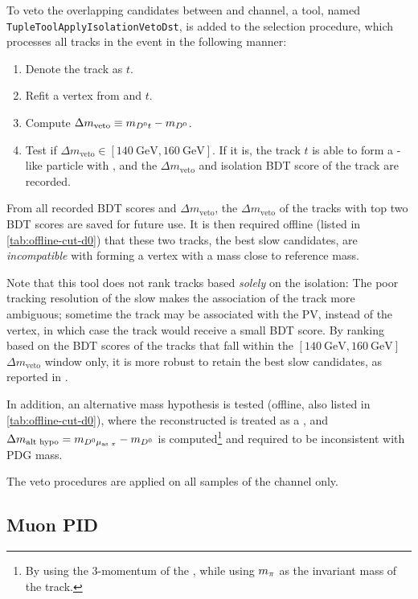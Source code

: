 To veto the overlapping candidates between \Dz and \Dstar channel,
a tool, named \texttt{TupleToolApplyIsolationVetoDst},
is added to the selection procedure, which processes all tracks
in the event in the following manner:

\begin{enumerate}
    \item Denote the track as $t$.
    \item Refit a vertex from \Dz and $t$.
    \item Compute $\Delta m_\text{veto} \equiv m_{{{D}^0} t} - m_{{D}^0}$.
    \item Test if $\Delta m_\text{veto} \in [140~\text{GeV}, 160~\text{GeV}]$.
        If it is, the track $t$ is able to form a \Dstar-like particle with \Dz,
        and the $\Delta m_\text{veto}$ and isolation BDT score
        of the track are recorded.
\end{enumerate}

From all recorded BDT scores and $\Delta m_\text{veto}$, the
$\Delta m_\text{veto}$ of the tracks with top two BDT scores are saved
for future use.
It is then required offline (listed in \cref{tab:offline-cut-d0})
that these two tracks,
the best slow \pion candidates,
are \emph{incompatible} with
forming a \Dz\pion vertex with a mass close to \Dstar reference mass.

Note that this tool does not rank tracks based \emph{solely} on the isolation:
The poor tracking resolution of the slow \pion makes the association of
the track more ambiguous; sometime the track may be associated with the PV,
instead of the \B vertex, in which case the track would receive a small BDT
score.
By ranking based on the BDT scores of the tracks that fall within the
$[140~\text{GeV}, 160~\text{GeV}]$
$\Delta m_\text{veto}$ window only,
it is more robust to retain the best slow \pion candidates,
as reported in \cite{LHCb-ANA-2020-056}.

In addition, an alternative mass hypothesis is tested
(offline, also listed in \cref{tab:offline-cut-d0}), where the reconstructed
\muon is treated as a \pion,
and $\Delta m_\text{alt hypo} = m_{{{D}^0}{\mu}_\text{as {\ensuremath{\pi}}}} - m_{{D}^0}$
is computed\footnote{
    By using the 3-momentum of the \muon, while using $m_{\pi}$ as the invariant
    mass of the track.
} and required to be inconsistent with \Dstar PDG mass.

The veto procedures are applied on all samples of the \Dz channel only.


\subsection{Muon PID}
\label{ref:sel:tech:ubdt}

